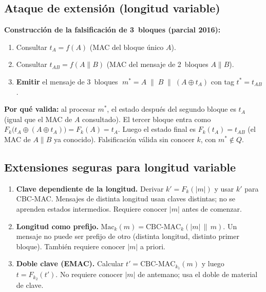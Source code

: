 \documentclass[11pt,a4paper]{article}
\begin{document}
\subsection{Ataque de extensi\'on (longitud variable)}

\begin{examen}
\textbf{Construcci\'on de la falsificaci\'on de 3~bloques (parcial 2016):}
\begin{enumerate}[leftmargin=1.6em]
  \item Consultar $t_A = f(A)$ (MAC del bloque \'unico $A$).
  \item Consultar $t_{AB} = f(A\|B)$ (MAC del mensaje de 2~bloques $A\|B$).
  \item \textbf{Emitir} el mensaje de 3~bloques
        $\;m^* = A \;\|\; B \;\|\; (A \oplus t_A)$
        con tag $t^* = t_{AB}$.
\end{enumerate}
\textbf{Por qu\'e valida:}
al procesar $m^*$, el estado despu\'es del segundo bloque es $t_A$ (igual que el
MAC de $A$ consultado).  El tercer bloque entra como
$F_k\!\bigl(t_A \oplus (A\oplus t_A)\bigr)=F_k(A)=t_A$.
Luego el estado final es $F_k(t_A) = t_{AB}$ (el MAC de $A\|B$ ya conocido).
Falsificaci\'on v\'alida sin conocer $k$, con $m^* \notin Q$.
\end{examen}

\subsection{Extensiones seguras para longitud variable}

\begin{enumerate}[leftmargin=1.6em]
  \item \textbf{Clave dependiente de la longitud.}
        Derivar $k' = F_k(|m|)$ y usar $k'$ para CBC-MAC.  Mensajes de distinta
        longitud usan claves distintas; no se aprenden estados intermedios.
        Requiere conocer $|m|$ antes de comenzar.
  \item \textbf{Longitud como prefijo.}
        $\mathrm{Mac}_k(m) = \mathrm{CBC\text{-}MAC}_k(|m|\,\|\,m)$.
        Un mensaje no puede ser prefijo de otro (distinta longitud, distinto primer
        bloque).  Tambi\'en requiere conocer $|m|$ a priori.
  \item \textbf{Doble clave (EMAC).}
        Calcular $t' = \mathrm{CBC\text{-}MAC}_{k_1}(m)$ y luego $t = F_{k_2}(t')$.
        No requiere conocer $|m|$ de antemano; usa el doble de material de clave.
\end{enumerate}
\end{document}
